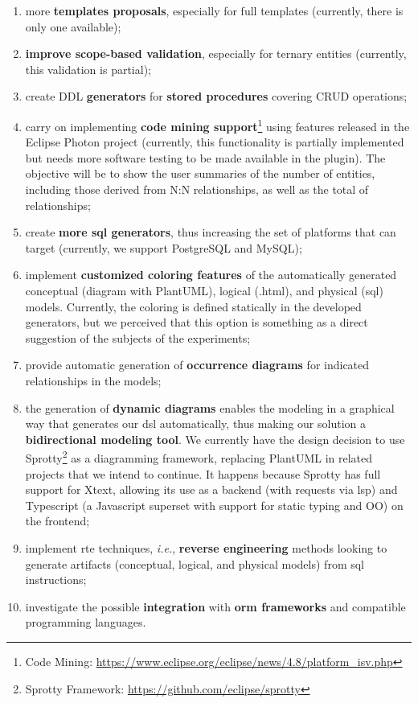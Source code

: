 \begin{enumerate} [label=\roman*.]
    \item more \textbf{templates proposals}, especially for full templates (currently, there is only one available);
    \item \textbf{improve scope-based validation}, especially for ternary entities (currently, this validation is partial);
    \item create DDL \textbf{generators} for \textbf{stored procedures} covering CRUD operations;
    \item carry on implementing  \textbf{code mining support}\footnote {Code Mining: \url{https://www.eclipse.org/eclipse/news/4.8/platform_isv.php}} using features released in the Eclipse Photon project (currently, this functionality is partially implemented but needs more software testing to be made available in the plugin).
    The objective will be to show the user summaries of the number of entities, including those derived from N:N relationships, as well as the total of relationships;
    \item create \textbf{more \ac{sql} generators}, thus increasing the set of platforms that can target (currently, we support PostgreSQL and MySQL);
    \item implement \textbf{customized coloring features} of the automatically generated conceptual (diagram with PlantUML), logical (.html), and physical (\ac{sql}) models. 
    Currently, the coloring is defined statically in the developed generators, but we perceived that this option is something as a direct suggestion of the subjects of the experiments;
    \item provide automatic generation of \textbf{occurrence diagrams} for indicated relationships in the models;
    \item the generation of \textbf{dynamic diagrams} enables the modeling in a graphical way that generates our \ac{dsl} automatically, thus making our solution a \textbf{bidirectional modeling tool}. We currently have the design decision to use Sprotty\footnote{Sprotty Framework: \url{https://github.com/eclipse/sprotty}} as a diagramming framework, replacing PlantUML in related projects that we intend to continue. It happens because Sprotty has full support for Xtext, allowing its use as a backend (with requests via \ac{lsp}) and Typescript (a Javascript superset with support for static typing and OO) on the frontend;
    \item implement \ac{rte} techniques, \textit{i.e.}, \textbf{reverse engineering} methods looking to generate artifacts (conceptual, logical, and physical models) from \ac{sql} instructions;
     \item investigate the possible \textbf{integration} with \textbf{\ac{orm} frameworks} and compatible programming languages.
\end{enumerate}

